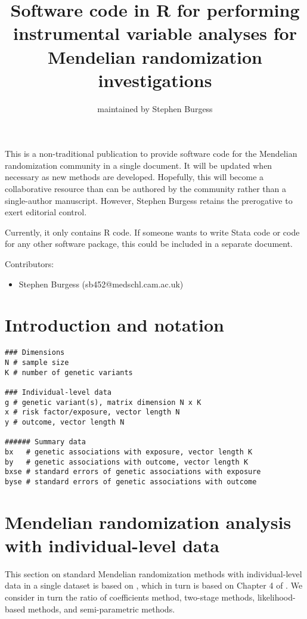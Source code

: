\documentclass[a4paper,12pt]{article} %
\begin{document}
\title{Software code in R for performing instrumental variable analyses for Mendelian randomization investigations}
\author{maintained by Stephen Burgess}
\maketitle
This is a non-traditional publication to provide software code for the Mendelian randomization community in a single document. It will be updated when necessary as new methods are developed. Hopefully, this will become a collaborative resource than can be authored by the community rather than a single-author manuscript. However, Stephen Burgess retains the prerogative to exert editorial control.

Currently, it only contains R code. If someone wants to write Stata code or code for any other software package, this could be included in a separate document.

Contributors: 
\begin{itemize}
\item Stephen Burgess (sb452@medschl.cam.ac.uk)
\end{itemize}

\clearpage

\tableofcontents %

\clearpage

\section{Introduction and notation}
\begin{lstlisting}
### Dimensions
N # sample size
K # number of genetic variants

### Individual-level data
g # genetic variant(s), matrix dimension N x K
x # risk factor/exposure, vector length N
y # outcome, vector length N

###### Summary data
bx   # genetic associations with exposure, vector length K
by   # genetic associations with outcome, vector length K
bxse # standard errors of genetic associations with exposure
byse # standard errors of genetic associations with outcome
\end{lstlisting}

\clearpage

\section{Mendelian randomization analysis with individual-level data}
This section on standard Mendelian randomization methods with individual-level data in a single dataset is based on \cite{burgess2015review}, which in turn is based on Chapter 4 of \cite{burgess2015book}. We consider in turn the ratio of coefficients method, two-stage methods, likelihood-based methods, and semi-parametric methods.
\end{document}

